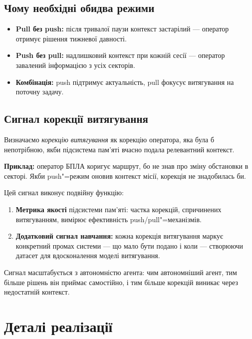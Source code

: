 \documentclass[11pt]{article}
\begin{document}
\subsection{Чому необхідні обидва режими}

\begin{itemize}[nosep]
  \item \textbf{Pull без push:} після тривалої паузи контекст застарілий --- оператор отримує рішення тижневої давності.
  \item \textbf{Push без pull:} надлишковий контекст при кожній сесії --- оператор завалений інформацією з усіх секторів.
  \item \textbf{Комбінація:} push підтримує актуальність, pull фокусує витягування на поточну задачу.
\end{itemize}



\subsection{Сигнал корекції витягування}
\label{sec:retrieval-correction}

Визначаємо \emph{корекцію витягування} як корекцію оператора, яка була б непотрібною, якби підсистема пам'яті вчасно подала релевантний контекст.

\textbf{Приклад:} оператор БПЛА коригує маршрут, бо не знав про зміну обстановки в секторі.
Якби push"=режим оновив контекст місії, корекція не знадобилась би.

Цей сигнал виконує подвійну функцію:
\begin{enumerate}[nosep]
  \item \textbf{Метрика якості} підсистеми пам'яті: частка корекцій, спричинених витягуванням, вимірює ефективність push/pull"=механізмів.
  \item \textbf{Додатковий сигнал навчання:} кожна корекція витягування маркує конкретний промах системи --- що мало бути подано і коли --- створюючи датасет для вдосконалення моделі витягування.
\end{enumerate}

Сигнал масштабується з автономністю агента: чим автономніший агент, тим більше рішень він приймає самостійно, і тим більше корекцій виникає через недостатній контекст.


\section{Деталі реалізації}
\label{sec:implementation}
\end{document}
